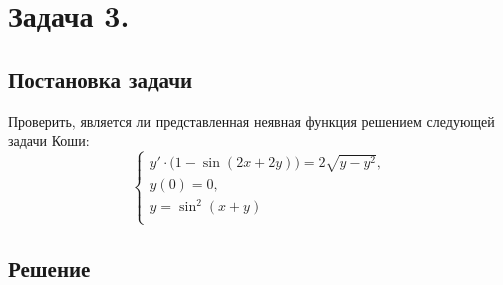 \def \equation {{y}' \cdot \big(1 - \sin{(2x + 2y)} \big) = 2\sqrt{y - y^{2}}}

\def \conditionsOne {y(0) = 0}
\def \conditionsTwo {y = \sin^{2}{(x + y)}}

\section{Задача 3.}
\subsection{Постановка задачи}
Проверить, является ли представленная неявная функция решением следующей задачи Коши:
\begin{equation*}
	\begin{cases}
		\equation, \\
		\conditionsOne, \\
		\conditionsTwo \\
	\end{cases}
\end{equation*}

\subsection{Решение}
